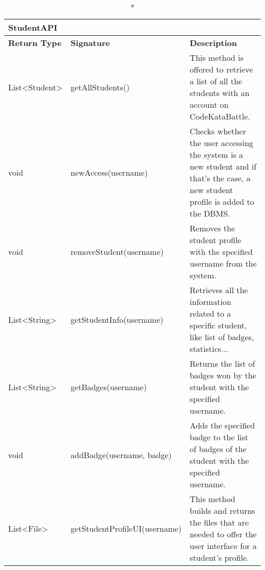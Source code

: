 \begin{longtable}{|p{2.5cm} p{6.5cm} p{4.5cm}|}
	\caption*{StudentAPI}\\ 
	
	\hline
	\textbf{Return Type} & \textbf{Signature} & \textbf{Description}\\
	\hline \endhead
	
	List\textless Student\textgreater & getAllStudents() & This method is offered to retrieve a list of all the students with an account on CodeKataBattle.\\
	
	void & newAccess(username) & Checks whether the user accessing the system is a new student and if that's the case, a new student profile is added to the DBMS. \\
	
	void & removeStudent(username) & Removes the student profile with the specified username from the system.\\
	
	List\textless String\textgreater & getStudentInfo(username) & Retrieves all the information related to a specific student, like list of badges, statistics...\\
	
	List\textless String\textgreater & getBadges(username) & Returns the list of badges won by the student with the specified username.\\
	
	void & addBadge(username, badge) & Adds the specified badge to the list of badges of the student with the specified username.\\
	
	List\textless File\textgreater & getStudentProfileUI(username) & This method builds and returns the files that are needed to offer the user interface for a student's profile.\\
	\hline
	
\end{longtable}

